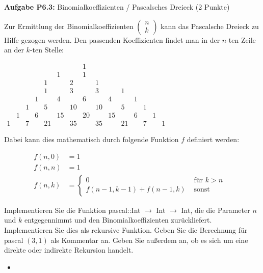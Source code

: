\newpage

\textbf{Aufgabe P6.3:} Binomialkoeffizienten / Pascalsches Dreieck (2 Punkte)

Zur Ermittlung der Binomialkoeffizienten $\left(\begin{array}{l}n \\ k\end{array}\right)$ kann das Pascalsche Dreieck zu Hilfe gezogen werden. Den passenden Koeffizienten findet man in der $n$-ten Zeile an der $k$-ten Stelle:

$\begin{array}{cccccccccccccccc} & & & & & & & 1 & & & & & & & \\ & & & & & 1 & & 1 & & & & & & \\ & & & & 1 & & 2 & & 1 & & & & & \\ & & & & 1 & & 3 & & 3 & & 1 & & & \\ & & & 1 & & 4 & & 6 & & 4 & & 1 & & \\ & & 1 & & 5 & & 10 & & 10 & & 5 & & 1 & & \\ & 1 & & 6 & & 15 & & 20 & & 15 & & 6 & & 1 & \\ 1 & & 7 & & 21 & & 35 & & 35 & & 21 & & 7 & & 1\end{array}$

Dabei kann dies mathematisch durch folgende Funktion $f$ definiert werden:

$$
\begin{array}{rlr}
f(n, 0) & =1 \\
f(n, n) & =1 & \\
f(n, k) & = \begin{cases}0 & \text { für } k>n \\
f(n-1, k-1)+f(n-1, k) & \text { sonst }\end{cases}
\end{array}
$$

Implementieren Sie die Funktion pascal::Int $\rightarrow$ Int $\rightarrow$ Int, die die Parameter $n$ und $k$ entgegennimmt und den Binomialkoeffizienten zurückliefert. Implementieren Sie dies als rekursive Funktion. Geben Sie die Berechnung für pascal $(3,1)$ als Kommentar an. Geben Sie außerdem an, ob es sich um eine direkte oder indirekte Rekursion handelt.

\begin{itemize}
  \item []\inputminted{Haskell}{A6_3.hs}
\end{itemize}

\newpage

